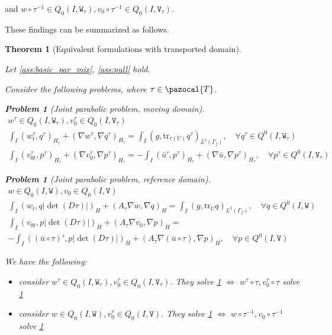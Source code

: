\documentclass[english,a4paper,10pt,oneside]{scrbook}	%
\theoremstyle{break}
\newtheorem{thm}[equation]{Theorem}
\newtheorem{pb}[equation]{Problem}
\theoremstyle{remark}
\newcommand{\tr}{\text{tr}}
\newcommand{\cT}{\pazocal{T}}
\newcommand{\tw}[1]{\texttt{#1}}
\begin{document}
\begin{appendices}
and $w\circ \tau^{-1} \in Q_0(I, \tw{W}_\tau), v_0\circ \tau^{-1} \in Q_0(I,\tw{V}_\tau)$.

These findings can be summarized as follows.

\begin{thm}[Equivalent formulations with transported domain]
\label{thm:eq_pde}

Let \cref{ass:basic_par_mix}, \cref{ass:pull} hold.

Consider the following problems, where $\tau \in \cT$.

\begin{pb}[Joint parabolic problem, moving domain]
\label{pb:joint_mov}
\begin{align*}
w^\tau \in Q_0(I, \tw{W}_\tau), v_0^\tau \in Q_0(I,\tw{V}_\tau) \\
\int_I  (w^\tau_t , q^\tau)_{H_\tau}+ (\nabla w^\tau, \nabla q^\tau)_{H_\tau} = \int_I(g,\tr_{\tau(U)} q^\tau)_{L^2(\Gamma_f)}, \quad \forall q^\tau \in Q^0(I, \tw{W}_\tau) \\
\int_I (v^\tau_{0t},p^\tau)_{H_\tau} + (\nabla v_0^\tau, \nabla p^\tau)_{H_\tau}= -\int_I(\bar{u}',p^\tau)_{H_\tau}+(\nabla \bar{u}, \nabla p^\tau)_{H_\tau}, \quad \forall p^\tau \in Q^0(I, \tw{V}_\tau)
\end{align*}
\end{pb}

\begin{pb}[Joint parabolic problem, reference domain]
\label{pb:joint_ref}
\begin{align*}
w \in Q_0(I, \tw{W}), v_0 \in Q_0(I,\tw{V}) \\
\int_I ( w_t , q |\det(D\tau)|)_H+ (A_\tau\nabla w, \nabla q)_{H} =\int_I(g,\tr_{U} q)_{L^2(\Gamma_f)}, \quad \forall q \in Q^0(I, \tw{W}) \\
\int_I ( v_{0t},p |\det(D\tau)|)_H + (A_\tau \nabla v_0, \nabla p)_{H}= \\-\int_I((\bar{u}\circ \tau)',p|\det(D\tau)|)_{H}+(A_\tau \nabla (\bar{u} \circ \tau), \nabla p)_{H}, \quad \forall p \in Q^0(I, \tw{V})
\end{align*}
\end{pb}

We have the following:

\begin{itemize}
	\item consider $w^\tau \in Q_0(I, \tw{W}_\tau), v_0^\tau \in Q_0(I,\tw{V}_\tau)$. They solve \cref{pb:joint_mov} $\iff$ $w^\tau\circ \tau , v_0^\tau\circ \tau $ solve \cref{pb:joint_ref}
	\item consider $w \in Q_0(I, \tw{W}), v_0^\tau \in Q_0(I,\tw{V})$. They solve \cref{pb:joint_ref} $\iff$ $w\circ \tau^{-1}, v_0\circ \tau^{-1}$ solve \cref{pb:joint_mov} 


\end{itemize}
\end{thm}
\end{appendices}
\end{document}
